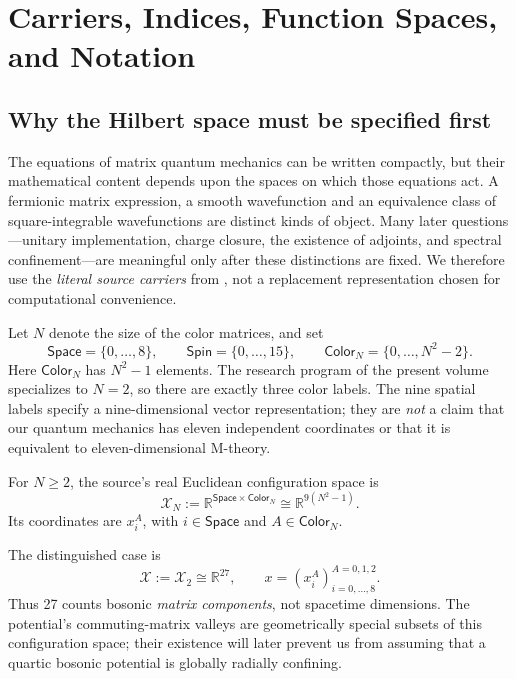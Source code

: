 \chapter{Carriers, Indices, Function Spaces, and Notation}
\label{ch:carriers}

\section{Why the Hilbert space must be specified first}
The equations of matrix quantum mechanics can be written compactly, but their
mathematical content depends upon the spaces on which those equations act. A
fermionic matrix expression, a smooth wavefunction and an equivalence class of
square-integrable wavefunctions are distinct kinds of object. Many later
questions---unitary implementation, charge closure, the existence of adjoints,
and spectral confinement---are meaningful only after these distinctions are
fixed. We therefore use the \emph{literal source carriers} from
, not a replacement representation
chosen for computational convenience.

Let $N$ denote the size of the color matrices, and set
\begin{equation}\label{eq:source-indices}
 \mathsf{Space}=\{0,\ldots,8\},\qquad
 \mathsf{Spin}=\{0,\ldots,15\},\qquad
 \mathsf{Color}_{N}=\{0,\ldots,N^2-2\}.
\end{equation}
Here $\mathsf{Color}_{N}$ has $N^2-1$ elements. The research program of the
present volume specializes to $N=2$, so there are exactly three color labels.
The nine spatial labels specify a nine-dimensional vector representation;
they are \emph{not} a claim that our quantum mechanics has eleven independent
coordinates or that it is equivalent to eleven-dimensional M-theory.

\begin{definition}\label{def:boson-carrier}
For $N\geq2$, the source's real Euclidean configuration space is
\begin{equation}\label{eq:boson-carrier}
 \mathcal X_N
 :=\mathbb R^{\mathsf{Space}\times\mathsf{Color}_N}
 \cong\mathbb R^{9(N^2-1)}.
\end{equation}
Its coordinates are $x_i^A$, with $i\in\mathsf{Space}$ and
$A\in\mathsf{Color}_N$.
\end{definition}
The distinguished case is
\begin{equation}\label{eq:boson-27}
 \mathcal X:=\mathcal X_2\cong\mathbb R^{27},
 \qquad x=(x_i^A)_{i=0,\ldots,8}^{A=0,1,2}.
\end{equation}
Thus 27 counts bosonic \emph{matrix components}, not spacetime dimensions.
The potential's commuting-matrix valleys are geometrically special subsets
of this configuration space; their existence will later prevent us from
assuming that a quartic bosonic potential is globally radially confining.

